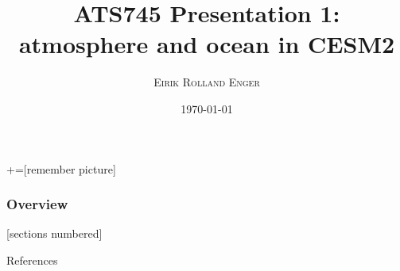 \documentclass[xcolor=dvipsnames]{beamer} %
\title[ATS745: 1]{ATS745 Presentation 1: atmosphere and ocean in CESM2}
\author{\textsc{Eirik Rolland Enger}}
\date{%
	\today%
}
\begin{document}
\maketitle

+=[remember picture]
\everymath{\displaystyle}

\begin{frame}%
	\frametitle{Overview}

	[sections numbered]
	\tableofcontents[hideallsubsections]

\end{frame}



\appendix
% 
\begin{frame}[allowframebreaks]{References}

\printbibliography[heading=none]

\end{frame}
\end{document}
